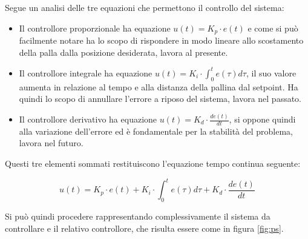 \documentclass[11pt]{article}
\begin{document}
Segue un analisi delle tre equazioni che permettono il controllo del sistema:

\begin{itemize}
\item Il controllore proporzionale ha equazione $u(t)=K_p \cdot e(t)$ e come si può facilmente notare ha lo scopo di rispondere in modo lineare allo scostamento della palla dalla posizione desiderata, lavora al presente.
\item Il controllore integrale ha equazione $u(t)=K_i \cdot \int_0^t e(\tau)d\tau$, il suo valore aumenta in relazione al tempo e alla distanza della pallina dal setpoint. Ha quindi lo scopo di annullare l'errore a riposo del sistema, lavora nel passato.
\item Il controllore derivativo ha equazione $u(t)=K_d\cdot \frac{de(t)}{dt}$, si oppone quindi alla variazione dell'errore ed è fondamentale per la stabilità del problema, lavora nel futuro.
\end{itemize}
Questi tre elementi sommati restituiscono l'equazione tempo continua seguente:

\begin{equation}\label{pidtc}
    u(t)=K_p \cdot e(t) + K_i \cdot \int_0^t e(\tau)d\tau + K_d\cdot \frac{de(t)}{dt}
\end{equation}

Si può quindi procedere rappresentando complessivamente il sistema da controllare
e il relativo controllore, che risulta essere come in figura \ref{fig:ps}.
\end{document}
